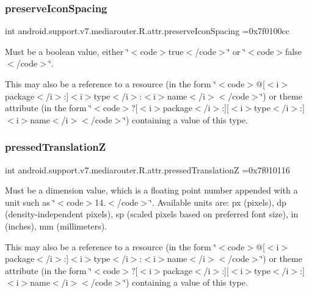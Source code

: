 \subsubsection{\texorpdfstring{preserve\+Icon\+Spacing}{preserveIconSpacing}}
{\footnotesize\ttfamily int android.\+support.\+v7.\+mediarouter.\+R.\+attr.\+preserve\+Icon\+Spacing =0x7f0100cc\hspace{0.3cm}{\ttfamily [static]}}

Must be a boolean value, either \char`\"{}$<$code$>$true$<$/code$>$\char`\"{} or \char`\"{}$<$code$>$false$<$/code$>$\char`\"{}. 

This may also be a reference to a resource (in the form \char`\"{}$<$code$>$@\mbox{[}$<$i$>$package$<$/i$>$\+:\mbox{]}$<$i$>$type$<$/i$>$\+:$<$i$>$name$<$/i$>$$<$/code$>$\char`\"{}) or theme attribute (in the form \char`\"{}$<$code$>$?\mbox{[}$<$i$>$package$<$/i$>$\+:\mbox{]}\mbox{[}$<$i$>$type$<$/i$>$\+:\mbox{]}$<$i$>$name$<$/i$>$$<$/code$>$\char`\"{}) containing a value of this type. \mbox{\label{classandroid_1_1support_1_1v7_1_1mediarouter_1_1R_1_1attr_a71e55611e4cc49c76b82bdde3905b633}} 
\subsubsection{\texorpdfstring{pressed\+TranslationZ}{pressedTranslationZ}}
{\footnotesize\ttfamily int android.\+support.\+v7.\+mediarouter.\+R.\+attr.\+pressed\+TranslationZ =0x7f010116\hspace{0.3cm}{\ttfamily [static]}}

Must be a dimension value, which is a floating point number appended with a unit such as \char`\"{}$<$code$>$14.\+5sp$<$/code$>$\char`\"{}. Available units are\+: px (pixels), dp (density-\/independent pixels), sp (scaled pixels based on preferred font size), in (inches), mm (millimeters). 

This may also be a reference to a resource (in the form \char`\"{}$<$code$>$@\mbox{[}$<$i$>$package$<$/i$>$\+:\mbox{]}$<$i$>$type$<$/i$>$\+:$<$i$>$name$<$/i$>$$<$/code$>$\char`\"{}) or theme attribute (in the form \char`\"{}$<$code$>$?\mbox{[}$<$i$>$package$<$/i$>$\+:\mbox{]}\mbox{[}$<$i$>$type$<$/i$>$\+:\mbox{]}$<$i$>$name$<$/i$>$$<$/code$>$\char`\"{}) containing a value of this type. \mbox{\label{classandroid_1_1support_1_1v7_1_1mediarouter_1_1R_1_1attr_a4501e46b158aa49c8d42d3183d3fec44}} 
